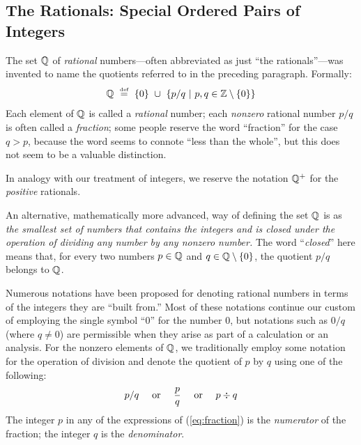 \subsection{The Rationals: Special Ordered Pairs of Integers}
\label{sec:define-rationals}

 
 
The set $\mathbb{Q}$ of {\it rational} numbers---often abbreviated as just ``the rationals''---was invented to name the quotients referred to in the preceding paragraph.  Formally:
\[ \mathbb{Q} \ \stackrel{\mbox{{\tiny def}}}{=} \ \{0\} \ \cup \ \left\{ p/q \ | \ p, q \in \mathbb{Z}
\setminus \{0\} \right\}
\]
Each element of $\mathbb{Q}$ is called a {\it rational} number; each {\em nonzero} rational number $p/q$ is often called a {\em fraction}; some people reserve the word ``fraction'' for the case $q > p$, because the word seems to connote ``less than the whole'', but this does not seem to be a valuable distinction.

\smallskip

In analogy with our treatment of integers, we reserve the notation $\mathbb{Q}^+$ for the {\em positive} rationals.

\smallskip


An alternative, mathematically more advanced, way of defining the set $\mathbb{Q}$ is as {\em the smallest set of numbers that contains the integers and is closed under the operation of dividing any number by any nonzero number.}  The word ``{\it closed}'' here means that, for every two numbers $p \in \mathbb{Q}$ and $q \in \mathbb{Q} \setminus \{0\}$, the quotient $p/q$ belongs to $\mathbb{Q}$.

\smallskip

Numerous notations have been proposed for denoting rational numbers in terms of the integers they are ``built from.''  Most of these notations continue our custom of employing the single symbol ``$0$'' for the number $0$, but notations such as $0/q$ (where $q \neq 0$) are permissible when they arise as part of a calculation or an analysis.  For the nonzero elements of $\mathbb{Q}$, we traditionally employ some notation for the operation of division and denote the quotient of $p$ by $q$ using one of the following:
\begin{equation}
\label{eq:fraction}
 p/q \ \ \ \mbox{ or } \ \ \ {p \over q} \ \ \ \mbox{ or } \ \ \ p
 \div q
\end{equation}
The integer $p$ in any of the expressions of (\ref{eq:fraction}) is the {\it numerator} of the fraction; the integer $q$ is the {\it denominator}.
 
 


